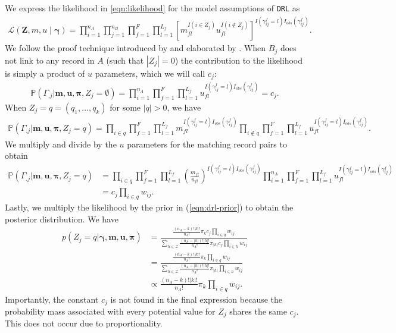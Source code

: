 \documentclass[12pt,letterpaper]{article}
\newcommand{\1}[1]{\mathbb{I}\!\left[#1\right]} %
\begin{document}
We express the likelihood in \eqref{eqn:likelihood} for the model assumptions of \texttt{DRL} as
\begin{align*} %
	\mathcal{L}(\bm{Z}, m,u\mid\bm{\gamma})=\prod_{i=1}^{n_A}\prod_{j=1}^{n_B}\prod_{f=1}^F\prod_{l=1}^{L_f}\left[m_{fl}^{I(i \in Z_j)}u_{fl}^{I(i \notin Z_j)}\right] ^{I(\gamma_{ij}^{f} = l) I_{obs}(\gamma_{ij}^f)}.
\end{align*}
We follow the proof technique introduced by \cite{wortman2019} and elaborated by \cite{kundinger_2023}. When $B_j$ does not link to any record in $A$ (such that $|Z_j| = 0$) the contribution to the likelihood is simply a product of $u$ parameters, which we will call $c_j$:
\begin{align*}
	\mathbb{P}(\Gamma_{.j}| \bm{m}, \bm{u}, \bm{\pi}, Z_j = \emptyset) = \prod_{i=1}^{n_A}\prod_{f=1}^{F}\prod_{l=1}^{L_f} u_{fl}^{I(\gamma_{ij}^f = l)I_{obs}(\gamma_{ij}^f)} = c_j.
\end{align*}
When $Z_j = q =  (q_1, \ldots, q_k)$ for some $|q| > 0$, we have
\begin{align*}
	\mathbb{P}(\Gamma_{.j}| \bm{m}, \bm{u}, \bm{\pi},  Z_j = q) =\prod_{i \in q}\prod_{f=1}^{F}\prod_{l=1}^{L_f} m_{fl}^{I(\gamma_{ij}^f = l)I_{obs}(\gamma_{ij}^f)}  \prod_{i \notin q}\prod_{f=1}^{F}\prod_{l=1}^{L_f} u_{fl}^{I(\gamma_{ij}^f = l)I_{obs}(\gamma_{ij}^f)}.
\end{align*}
We multiply and divide by the $u$ parameters for the matching record pairs to obtain
\begin{align*}
	\mathbb{P}(\Gamma_{.j}| \bm{m}, \bm{u}, \bm{\pi}, Z_j = q) &= \prod_{i \in q}\prod_{f=1}^{F}\prod_{l=1}^{L_f} \left(\frac{m_{fl}}{u_{fl}}\right)^{I(\gamma_{ij}^f = l)I_{obs}(\gamma_{ij}^f)}  \prod_{i = 1}^{n_A}\prod_{f=1}^{F}\prod_{l=1}^{L_f} u_{fl}^{I(\gamma_{ij}^f = l)I_{obs}(\gamma_{ij}^f)} \\
	&= c_j \prod_{i \in q} w_{ij} .
\end{align*}
Lastly, we multiply the likelihood by the prior in (\ref{eqn:drl-prior}) to obtain the posterior distribution. We have
	\begin{align*}
		p\left(Z_j  = q|\bm{\gamma}, \bm{m}, \bm{u}, \bm{\pi} \right) &= \frac{\frac{(n_A - k)!|k|!}{n_A!} \pi_{k} c_j \prod_{i \in q} w_{ij}}{\sum_{h \in \mathcal{Z}} \frac{(n_A - |h|)!|h|!}{n_A!} \pi_{|h|} c_j \prod_{i \in h} w_{ij}} \\
		&= \frac{\frac{(n_A - k)!|k|!}{n_A!} \pi_{k} \prod_{i \in q} w_{ij}}{\sum_{h \in \mathcal{Z}} \frac{(n_A - |h|)!|h|!}{n_A!} \pi_{|h|} \prod_{i \in h} w_{ij}} \\
		&\propto \frac{(n_A - k)!|k|!}{n_A!} \pi_{k} \prod_{i \in q} w_{ij}.
	\end{align*}
Importantly, the constant $c_j$ is not found in the final expression because the probability mass associated with every potential value for $Z_j$ shares the same $c_j$. This does not occur due to proportionality.
\end{document}
